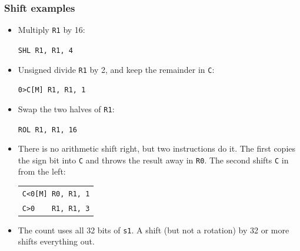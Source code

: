 \documentclass{beamer}
\newcommand{\code}[1]{\texttt{#1}}
\begin{document}
   \begin{frame}
    \frametitle{Shift examples}
    \begin{itemize}
     \item Multiply \code{R1} by 16:
      \begin{center}
       \code{SHL R1, R1, 4}
      \end{center}
     \item Unsigned divide \code{R1} by 2, and keep the remainder in
      \code{C}:
      \begin{center}
       \code{0>C[M] R1, R1, 1}
      \end{center}
     \item Swap the two halves of \code{R1}:
      \begin{center}
       \code{ROL R1, R1, 16}
      \end{center}
     \item There is no arithmetic shift right, but two instructions do it.
      The first copies the sign bit into \code{C} and throws the result
      away in \code{R0}. The second shifts \code{C} in from the left:
      \begin{center}
       \begin{tabular}{l}
        \code{C<0[M] R0, R1, 1}\\
        \code{C>0~~~~R1, R1, 3}\\
       \end{tabular}
      \end{center}
     \item The count uses all 32 bits of \code{s1}. A shift (but not a
      rotation) by 32 or more shifts everything out.
    \end{itemize}
   \end{frame}
%
\end{document}
